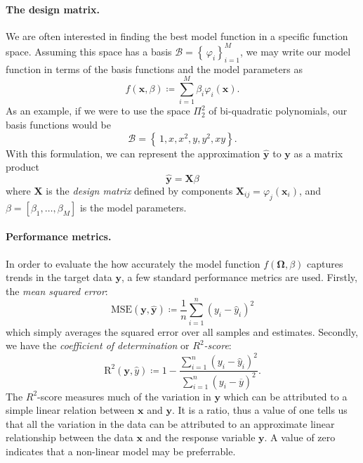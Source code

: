 \documentclass[article, a4paper, oneside, 12pt]{memoir}
\newcommand{\x}{\bm{x}}
\newcommand{\X}{\bm{X}}
\newcommand{\MSE}[1]{\mathrm{MSE}(#1)}
\newcommand{\R}[1]{\mathrm{R}^2(#1)}
\newcommand{\y}{\bm{y}}
\newcommand{\data}{\bm{\Omega}}
\newcommand{\basis}{\mathcal{B}}
\newcommand{\set}[1]{\left\{\, #1 \right\}}
\begin{document}
  \paragraph{The design matrix.} We are often interested in finding the best
  model function in a specific function space.  Assuming this space has a basis
  \( \basis = \set{\varphi_i}_{i=1}^M\), we may write our model function in
  terms of the basis functions and the model parameters as
  \begin{equation}
    \label{eq:gen_lin_mod}
    f(\x, \beta) \coloneqq \sum_{i = 1}^M \beta_i\varphi_i(\x).
  \end{equation}
  As an example, if we were to use the space \( \Pi_2^2 \) of bi-quadratic
  polynomials, our basis functions would be
  \begin{equation}
    \basis = \set{1, x, x^2, y, y^2, xy}.
  \end{equation}
  With this formulation, we can represent the approximation \( \hat{\y} \) to
  \( \y \) as a matrix product 
  \begin{equation}
    \label{eq:matrix_prod}
    \hat{\y} = \X\beta
  \end{equation}
  where \( \X \) is the \emph{design matrix} defined by components \(\X_{ij} =
  \varphi_j(\x_i)\), and \( \beta = [\beta_1, \ldots, \beta_M] \) is the model
  parameters. 

  \paragraph{Performance metrics.}
  In order to evaluate the how accurately the model function \( f(\data, \beta)
  \) captures trends in the target data \( \y \), a few standard performance
  metrics are  used.  Firstly, the \emph{mean squared error}:
  \begin{equation}
    \MSE{\y, \hat{\y}} \coloneqq \frac{1}{n} \sum_{i=1}^n (y_i - \hat{y}_i)^2
  \end{equation}
  which simply averages the squared error over all samples and estimates.
  Secondly, we have the \emph{coefficient of determination} or
  \emph{\(R^2\)-score}:
  \begin{equation}
    \R{\y, \hat{y}} \coloneqq 1 - \frac{\sum_{i=1}^n (y_i -
    \hat{y}_i)^2}{\sum_{i=1}^n (y_i - \overline{y})^2}.
  \end{equation}
  The \(R^2\)-score measures much of the variation in \( \y \) which can be
  attributed to a simple linear relation between \( \x \) and \( \y \). It is a
  ratio, thus a value of one tells us that all the variation in the data can be
  attributed to an approximate linear relationship between the data \(\x\) and
  the response variable \( \y \). A value of zero indicates that a non-linear
  model may be preferrable.
  
\end{document}
